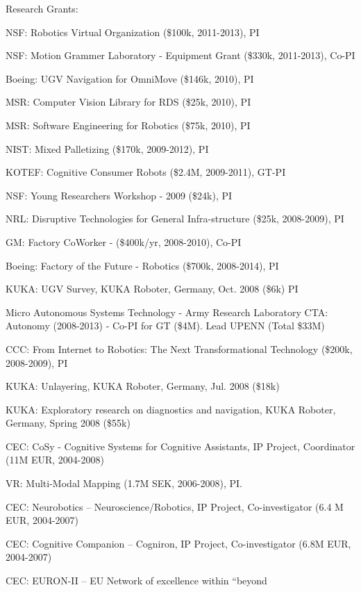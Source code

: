 \documentclass{article}
\begin{document}
\begin{cv}
\begin{cvlist}{Research Grants:}
		\item NSF: Robotics Virtual Organization (\$100k, 2011-2013), PI
		\item NSF: Motion Grammer Laboratory - Equipment Grant (\$330k, 2011-2013), Co-PI
		\item Boeing: UGV Navigation for OmniMove (\$146k, 2010), PI
		\item MSR: Computer Vision Library for RDS (\$25k, 2010), PI
		\item MSR: Software Engineering for Robotics (\$75k, 2010), PI
		\item NIST: Mixed Palletizing (\$170k, 2009-2012), PI
		\item KOTEF: Cognitive Consumer Robots (\$2.4M, 2009-2011), GT-PI
		\item NSF: Young Researchers Workshop - 2009 (\$24k), PI
		\item NRL: Disruptive Technologies for General Infra-structure  (\$25k, 2008-2009), PI
		\item GM: Factory CoWorker - (\$400k/yr, 2008-2010), Co-PI
		\item Boeing: Factory of the Future - Robotics (\$700k, 2008-2014), PI
		\item KUKA: UGV Survey, KUKA Roboter, Germany, Oct. 2008 (\$6k)  PI%
		\item Micro Autonomous Systems Technology - Army Research Laboratory
		CTA: Autonomy (2008-2013) - Co-PI for GT (\$4M). Lead UPENN (Total \$33M) %
		\item CCC: From Internet to Robotics: The Next Transformational
		Technology (\$200k, 2008-2009), PI %
		\item KUKA: Unlayering, KUKA Roboter, Germany, Jul. 2008 (\$18k) %
		\item KUKA: Exploratory research on diagnostics and navigation, KUKA
		Roboter, Germany, Spring 2008 (\$55k)%
		\item CEC: CoSy - Cognitive Systems for Cognitive Assistants, IP
		Project, Coordinator (11M EUR, 2004-2008)
		\item VR: Multi-Modal Mapping (1.7M SEK, 2006-2008), PI.%
		\item CEC: Neurobotics -- Neuroscience/Robotics, IP Project,
		Co-investigator (6.4 M EUR, 2004-2007)%
		\item CEC: Cognitive Companion -- Cogniron, IP Project,
		Co-investigator (6.8M EUR, 2004-2007) %
		\item CEC: EURON-II -- EU Network of excellence within ``beyond

\end{cvlist}
\end{cv}
\end{document}
